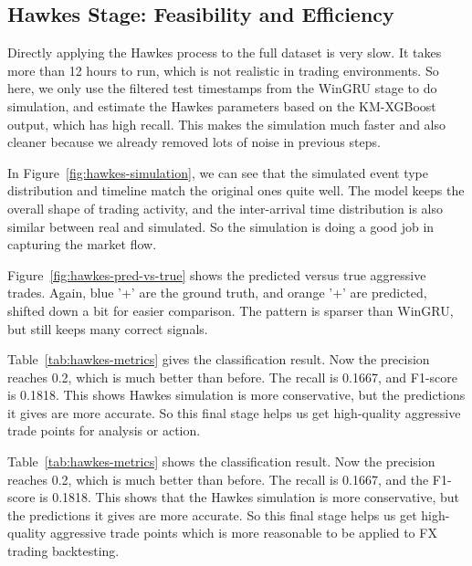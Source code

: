 \newpage

\subsection{Hawkes Stage: Feasibility and Efficiency}
Directly applying the Hawkes process to the full dataset is very slow. It takes more than 12 hours to run, which is not realistic in trading environments. So here, we only use the filtered test timestamps from the WinGRU stage to do simulation, and estimate the Hawkes parameters based on the KM-XGBoost output, which has high recall. This makes the simulation much faster and also cleaner because we already removed lots of noise in previous steps.

In Figure~\ref{fig:hawkes-simulation}, we can see that the simulated event type distribution and timeline match the original ones quite well. The model keeps the overall shape of trading activity, and the inter-arrival time distribution is also similar between real and simulated. So the simulation is doing a good job in capturing the market flow.

Figure~\ref{fig:hawkes-pred-vs-true} shows the predicted versus true aggressive trades. Again, blue '+' are the ground truth, and orange '+' are predicted, shifted down a bit for easier comparison. The pattern is sparser than WinGRU, but still keeps many correct signals.

Table~\ref{tab:hawkes-metrics} gives the classification result. Now the precision reaches 0.2, which is much better than before. The recall is 0.1667, and F1-score is 0.1818. This shows Hawkes simulation is more conservative, but the predictions it gives are more accurate. So this final stage helps us get high-quality aggressive trade points for analysis or action.

Table~\ref{tab:hawkes-metrics} shows the classification result. Now the precision reaches 0.2, which is much better than before. The recall is 0.1667, and the F1-score is 0.1818. This shows that the Hawkes simulation is more conservative, but the predictions it gives are more accurate. So this final stage helps us get high-quality aggressive trade points which is more reasonable to be applied to FX trading backtesting.

